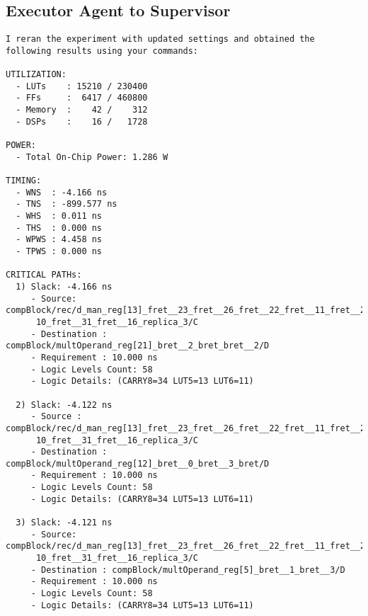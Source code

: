 \subsection{Executor Agent to Supervisor}
\vspace{-0.5em}
\begin{reviewerbox}
\begin{lstlisting}
I reran the experiment with updated settings and obtained the following results using your commands:

UTILIZATION:
  - LUTs    : 15210 / 230400  
  - FFs     :  6417 / 460800  
  - Memory  :    42 /    312  
  - DSPs    :    16 /   1728  

POWER:
  - Total On-Chip Power: 1.286 W

TIMING:
  - WNS  : -4.166 ns
  - TNS  : -899.577 ns
  - WHS  : 0.011 ns
  - THS  : 0.000 ns
  - WPWS : 4.458 ns
  - TPWS : 0.000 ns

CRITICAL PATHs:
  1) Slack: -4.166 ns
     - Source: compBlock/rec/d_man_reg[13]_fret__23_fret__26_fret__22_fret__11_fret__22_fret__
      10_fret__31_fret__16_replica_3/C
     - Destination : compBlock/multOperand_reg[21]_bret__2_bret_bret__2/D
     - Requirement : 10.000 ns
     - Logic Levels Count: 58
     - Logic Details: (CARRY8=34 LUT5=13 LUT6=11)

  2) Slack: -4.122 ns
     - Source : compBlock/rec/d_man_reg[13]_fret__23_fret__26_fret__22_fret__11_fret__22_fret__
      10_fret__31_fret__16_replica_3/C
     - Destination : compBlock/multOperand_reg[12]_bret__0_bret__3_bret/D
     - Requirement : 10.000 ns
     - Logic Levels Count: 58
     - Logic Details: (CARRY8=34 LUT5=13 LUT6=11)

  3) Slack: -4.121 ns
     - Source: compBlock/rec/d_man_reg[13]_fret__23_fret__26_fret__22_fret__11_fret__22_fret__
      10_fret__31_fret__16_replica_3/C
     - Destination : compBlock/multOperand_reg[5]_bret__1_bret__3/D
     - Requirement : 10.000 ns
     - Logic Levels Count: 58
     - Logic Details: (CARRY8=34 LUT5=13 LUT6=11)
\end{lstlisting}
\end{reviewerbox}



